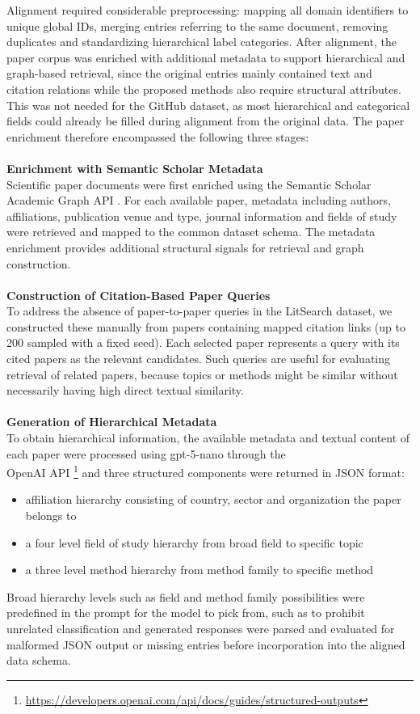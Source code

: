 \documentclass[11pt]{article}
\begin{document}
Alignment required considerable preprocessing: mapping all domain identifiers to unique global IDs, merging entries referring to the same document, removing duplicates and standardizing hierarchical label categories. After alignment, the paper corpus was enriched with additional metadata to support hierarchical and graph-based retrieval, since the original entries mainly contained text and citation relations while the proposed methods also require structural attributes. This was not needed for the GitHub dataset, as most hierarchical and categorical fields could already be filled during alignment from the original data.
The paper enrichment therefore encompassed the following three stages:\\
\\
\textbf{Enrichment with Semantic Scholar Metadata}\\
Scientific paper documents were first enriched using the Semantic Scholar Academic Graph API \cite{kinney2025semanticscholaropendata}. For each available paper, metadata including authors, affiliations, publication venue and type, journal information and fields of study were retrieved and mapped to the common dataset schema. The metadata enrichment provides additional structural signals for retrieval and graph construction.\\
\\
\textbf{Construction of Citation-Based Paper Queries}\\
To address the absence of paper-to-paper queries in the LitSearch dataset, we constructed these manually from papers containing mapped citation links (up to 200 sampled with a fixed seed). Each selected paper represents a query with its cited papers as the relevant candidates. Such queries are useful for evaluating retrieval of related papers, because topics or methods might be similar without necessarily having high direct textual similarity.\\
\\
\textbf{Generation of Hierarchical Metadata}\\
To obtain hierarchical information, the available metadata and textual content of each paper were processed using gpt-5-nano through the\\
OpenAI API \footnote{\url{https://developers.openai.com/api/docs/guides/structured-outputs}} and three structured components were returned in JSON format:
\begin{itemize}
    \setlength{\itemsep}{0pt}
    \setlength{\parskip}{0pt}
    \setlength{\topsep}{4pt}
    \item affiliation hierarchy consisting of country, sector and organization the paper belongs to
    \item a four level field of study hierarchy from broad field to specific topic
    \item a three level method hierarchy from method family to specific method
\end{itemize}
Broad hierarchy levels such as field and method family possibilities were predefined in the prompt for the model to pick from, such as to prohibit unrelated classification and generated responses were parsed and evaluated for malformed JSON output or missing entries before incorporation into the aligned data schema.
\end{document}
